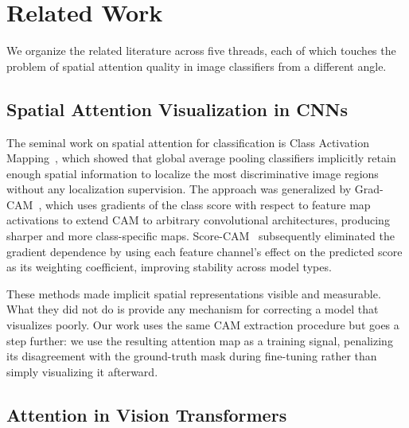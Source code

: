 \documentclass[journal]{IEEEtran}
\begin{document}
\section{Related Work}
\label{sec:related}

We organize the related literature across five threads, each of
which touches the problem of spatial attention quality in image
classifiers from a different angle.

\subsection{Spatial Attention Visualization in CNNs}

The seminal work on spatial attention for classification is Class
Activation Mapping~\cite{zhou2016learning}, which showed that global
average pooling classifiers implicitly retain enough spatial
information to localize the most discriminative image regions
without any localization supervision. The approach was generalized
by Grad-CAM~\cite{selvaraju2017gradcam}, which uses gradients
of the class score with respect to feature map activations to extend
CAM to arbitrary convolutional architectures, producing sharper and
more class-specific maps. Score-CAM~\cite{wang2020scorecam}
subsequently eliminated the gradient dependence by using each
feature channel's effect on the predicted score as its weighting
coefficient, improving stability across model types.

These methods made implicit spatial representations visible and
measurable. What they did not do is provide any mechanism for
correcting a model that visualizes poorly. Our work uses the
same CAM extraction procedure but goes a step further: we use
the resulting attention map as a training signal, penalizing its
disagreement with the ground-truth mask during fine-tuning rather
than simply visualizing it afterward.

\subsection{Attention in Vision Transformers}
\end{document}
